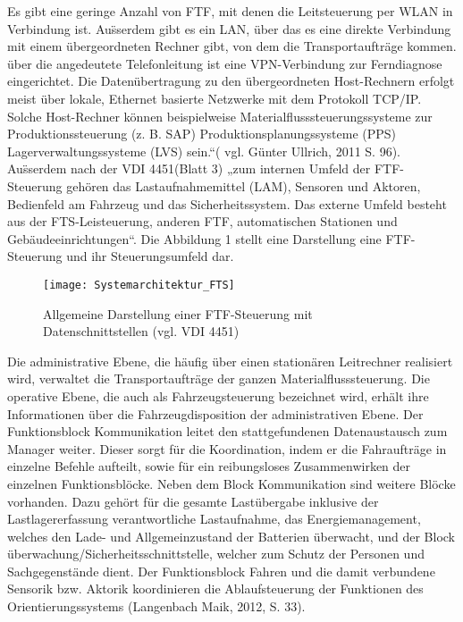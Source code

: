 Es gibt eine geringe Anzahl von FTF, mit denen die Leitsteuerung per WLAN in Verbindung ist. Au\"sserdem gibt es ein LAN, \"uber das es eine direkte Verbindung mit einem \"ubergeordneten Rechner gibt, von dem die Transportauftr\"age kommen. \"uber die angedeutete Telefonleitung ist eine VPN-Verbindung zur Ferndiagnose eingerichtet. Die Daten\"ubertragung zu den \"ubergeordneten Host-Rechnern erfolgt meist \"uber lokale, Ethernet basierte Netzwerke mit dem Protokoll TCP/IP. Solche Host-Rechner k\"onnen beispielweise Materialflusssteuerungssysteme zur Produktionssteuerung (z. B. SAP) Produktionsplanungssysteme (PPS) Lagerverwaltungssysteme (LVS) sein.“( vgl. G\"unter Ullrich, 2011 S. 96). 
Au\"sserdem nach der VDI 4451(Blatt 3) „zum internen Umfeld der FTF-Steuerung geh\"oren das Lastaufnahmemittel (LAM), Sensoren und Aktoren, Bedienfeld am Fahrzeug und das Sicherheitssystem. Das externe Umfeld besteht aus der FTS-Leisteuerung, anderen FTF, automatischen Stationen und Geb\"audeeinrichtungen“. Die Abbildung 1 stellt eine Darstellung eine FTF-Steuerung und ihr Steuerungsumfeld dar.
	\begin{figure}[h!]
	\centering
  \texttt{[image: Systemarchitektur\_FTS]}
	\caption{Allgemeine Darstellung einer FTF-Steuerung mit Datenschnittstellen (vgl. VDI 4451)}
	\label{Wertschoepfungskette}
\end{figure}
Die administrative Ebene, die h\"aufig \"uber einen station\"aren Leitrechner realisiert wird, verwaltet die Transportauftr\"age der ganzen Materialflusssteuerung. Die operative Ebene, die auch als Fahrzeugsteuerung bezeichnet wird, erh\"alt ihre Informationen \"uber die Fahrzeugdisposition der administrativen Ebene. Der Funktionsblock Kommunikation leitet den stattgefundenen Datenaustausch zum Manager weiter. Dieser sorgt f\"ur die Koordination, indem er die Fahrauftr\"age in einzelne Befehle aufteilt, sowie f\"ur ein reibungsloses Zusammenwirken der einzelnen Funktionsbl\"ocke. Neben dem Block Kommunikation sind weitere Bl\"ocke vorhanden. Dazu geh\"ort f\"ur die gesamte Last\"ubergabe inklusive der Lastlagererfassung verantwortliche Lastaufnahme, das Energiemanagement, welches den Lade- und Allgemeinzustand der Batterien \"uberwacht, und der Block \"uberwachung/Sicherheitsschnittstelle, welcher zum Schutz der Personen und Sachgegenst\"ande dient. Der Funktionsblock Fahren und die damit verbundene Sensorik bzw. Aktorik koordinieren die Ablaufsteuerung der Funktionen des Orientierungssystems (Langenbach Maik, 2012, S. 33).

